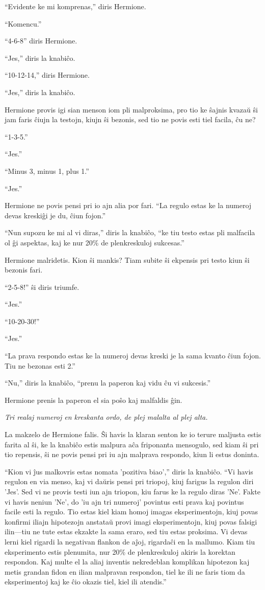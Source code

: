 ``Evidente ke mi komprenas,'' diris Hermione.

``Komencu.''

``4-6-8'' diris Hermione.

``Jes,'' diris la knabiĉo.

``10-12-14,'' diris Hermione.

``Jes,'' diris la knabiĉo.

Hermione provis igi sian menson iom pli malproksima, pro tio ke ŝajnis
kvazaŭ ŝi jam faris ĉiujn la testojn, kiujn ŝi bezonis, sed tio ne
povis esti tiel facila, ĉu ne?

``1-3-5.''

``Jes.''

``Minus 3, minus 1, plus 1.''

``Jes.''

Hermione ne povis pensi pri io ajn alia por fari. ``La regulo estas ke
la numeroj devas kreskiĝi je du, ĉiun fojon.''

``Nun supozu ke mi al vi diras,'' diris la knabiĉo, ``ke tiu testo
estas pli malfacila ol ĝi aspektas, kaj ke nur 20\% de plenkreskuloj
sukcesas.''

Hermione malridetis. Kion ŝi mankis? Tiam subite ŝi ekpensis pri testo
kiun ŝi bezonis fari.

``2-5-8!'' ŝi diris triumfe.

``Jes.''

``10-20-30!''

``Jes.''

``La prava respondo estas ke la numeroj devas kreski je la sama kvanto
ĉiun fojon. Tiu ne bezonas esti 2.''

``Nu,'' diris la knabiĉo, ``prenu la paperon kaj vidu ĉu vi
sukcesis.''

Hermione prenis la paperon el sia poŝo kaj malfaldis ĝin.

\emph{Tri realaj numeroj en kreskanta ordo, de plej malalta al plej
  alta.}

La makzelo de Hermione falis. Ŝi havis la klaran senton ke io terure
maljusta estis farita al ŝi, ke la knabiĉo estis malpura aĉa
friponanta mensogulo, sed kiam ŝi pri tio repensis, ŝi ne povis pensi
pri iu ajn malprava respondo, kiun li estus doninta.

``Kion vi ĵus malkovris estas nomata 'pozitiva biao','' diris la
knabiĉo. ``Vi havis regulon en via menso, kaj vi daŭris pensi pri
triopoj, kiuj farigus la regulon diri 'Jes'. Sed vi ne provis testi
iun ajn triopon, kiu farus ke la regulo diras 'Ne'. Fakte vi havis
neniun 'Ne', do 'iu ajn tri numeroj' povintus esti prava kaj povintus
facile esti la regulo. Tio estas kiel kiam homoj imagas
eksperimentojn, kiuj povas konfirmi iliajn hipotezojn anstataŭ provi
imagi eksperimentojn, kiuj povas falsigi ilin—tiu ne tute estas
ekzakte la sama eraro, sed tiu estas proksima. Vi devas lerni kiel
rigardi la negativan flankon de aĵoj, rigardaĉi en la mallumo. Kiam
tiu eksperimento estis plenumita, nur 20\% de plenkreskuloj akiris la
korektan respondon. Kaj multe el la aliaj inventis nekredeblan
komplikan hipotezon kaj metis grandan fidon en ilian malpravan
respondon, tiel ke ili ne faris tiom da eksperimentoj kaj ke ĉio okazis
tiel, kiel ili atendis.''

